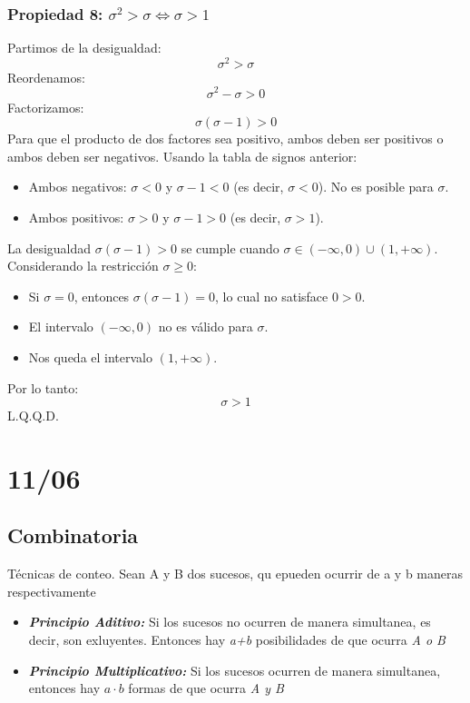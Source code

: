 \documentclass[12pt, letterpaper]{article}
\begin{document}
            \subsubsection{Propiedad 8: $\sigma^2 > \sigma \iff \sigma > 1$}
                Partimos de la desigualdad:
                \[\sigma^2 > \sigma \]
                Reordenamos:
                \[\sigma^2-\sigma > 0 \]
                Factorizamos:
                \[\sigma(\sigma-1) > 0 \]
                Para que el producto de dos factores sea positivo, ambos deben ser positivos o ambos deben ser negativos. Usando la tabla de signos anterior:
                \begin{itemize}
                    \item Ambos negativos: $\sigma < 0$ y $\sigma-1 < 0$ (es decir, $\sigma < 0$). No es posible para $\sigma$.
                    \item Ambos positivos: $\sigma > 0$ y $\sigma-1 > 0$ (es decir, $\sigma > 1$).
                \end{itemize}
                La desigualdad $\sigma(\sigma-1) > 0$ se cumple cuando $\sigma \in (-\infty, 0) \cup (1, +\infty)$.
                Considerando la restricción $\sigma \ge 0$:
                \begin{itemize}
                    \item Si $\sigma=0$, entonces $\sigma(\sigma-1)=0$, lo cual no satisface $0>0$.
                    \item El intervalo $(-\infty,0)$ no es válido para $\sigma$.
                    \item Nos queda el intervalo $(1, +\infty)$.
                \end{itemize}
                Por lo tanto:
                \[\sigma > 1\]
                L.Q.Q.D.
                \newpage

    \section{11/06}
    \subsection{Combinatoria} Técnicas de conteo. Sean A y B dos sucesos, qu epueden ocurrir de a y b maneras respectivamente
    \begin{itemize}
        \item \textbf{\textit{Principio Aditivo:}} Si los sucesos no ocurren de manera simultanea, es decir, son exluyentes. Entonces hay \textit{a+b} posibilidades de que ocurra \textit{A o B}
        \item \textbf{\textit{Principio Multiplicativo:}} Si los sucesos ocurren de manera simultanea, entonces hay $a \cdot b$ formas de que ocurra \textit{A y B}
    \end{itemize}
\end{document}
